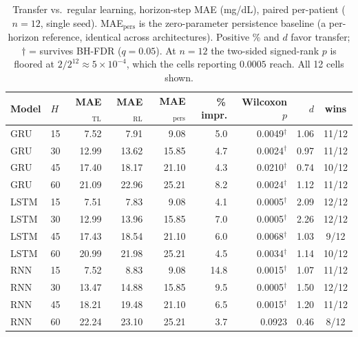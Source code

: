 \documentclass[conference]{IEEEtran}
\begin{document}
\begin{table}[t]
\centering
\caption{Transfer vs.\ regular learning, horizon-step MAE (mg/dL), paired
per-patient ($n=12$, single seed). MAE$_{\text{pers}}$ is the zero-parameter
persistence baseline (a per-horizon reference, identical across architectures).
Positive \% and $d$ favor transfer; $\dagger$ = survives BH-FDR ($q=0.05$). At
$n=12$ the two-sided signed-rank $p$ is floored at $2/2^{12}\approx5\times10^{-4}$,
which the cells reporting $0.0005$ reach. All 12 cells shown.}
\label{tab:finding1}
\small
\setlength{\tabcolsep}{3pt}
\begin{tabular}{@{}ll rrr r r r c@{}}
\toprule
Model & $H$ & MAE$_{\text{TL}}$ & MAE$_{\text{RL}}$ & MAE$_{\text{pers}}$ & \%\,impr. & Wilcoxon $p$ & $d$ & wins \\
\midrule
GRU  & 15 &  7.52 &  7.91 &  9.08 &  5.0 & 0.0049$^\dagger$ & 1.06 & 11/12 \\
GRU  & 30 & 12.99 & 13.62 & 15.85 &  4.7 & 0.0024$^\dagger$ & 0.97 & 11/12 \\
GRU  & 45 & 17.40 & 18.17 & 21.10 &  4.3 & 0.0210$^\dagger$ & 0.74 & 10/12 \\
GRU  & 60 & 21.09 & 22.96 & 25.21 &  8.2 & 0.0024$^\dagger$ & 1.12 & 11/12 \\
\addlinespace[2pt]
LSTM & 15 &  7.51 &  7.83 &  9.08 &  4.1 & 0.0005$^\dagger$ & 2.09 & 12/12 \\
LSTM & 30 & 12.99 & 13.96 & 15.85 &  7.0 & 0.0005$^\dagger$ & 2.26 & 12/12 \\
LSTM & 45 & 17.43 & 18.54 & 21.10 &  6.0 & 0.0068$^\dagger$ & 1.03 &  9/12 \\
LSTM & 60 & 20.99 & 21.98 & 25.21 &  4.5 & 0.0034$^\dagger$ & 1.14 & 10/12 \\
\addlinespace[2pt]
RNN  & 15 &  7.52 &  8.83 &  9.08 & 14.8 & 0.0015$^\dagger$ & 1.07 & 11/12 \\
RNN  & 30 & 13.47 & 14.88 & 15.85 &  9.5 & 0.0005$^\dagger$ & 1.50 & 12/12 \\
RNN  & 45 & 18.21 & 19.48 & 21.10 &  6.5 & 0.0015$^\dagger$ & 1.20 & 11/12 \\
RNN  & 60 & 22.24 & 23.10 & 25.21 &  3.7 & 0.0923           & 0.46 &  8/12 \\
\bottomrule
\end{tabular}
\end{table}

\end{document}
